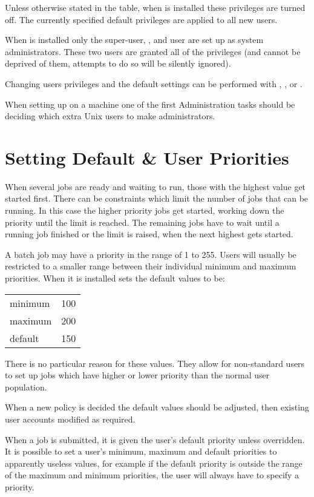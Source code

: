Unless otherwise stated in the table, when \ProductName{} is installed these
privileges are turned off. The currently specified default privileges
are applied to all new users.

When \ProductName{} is installed only the super-user, , and user \batchuser{} are set up
as system administrators. These two users are granted all of the privileges (and cannot be deprived of them, attempts to do
so will be silently ignored).

Changing users privileges and the default settings can be performed with \PrBtuser, \PrBtuchange, \PrXbtuser{} or
\PrXmbtuser.

When setting up \ProductName{} on a machine one of the first Administration tasks should be deciding which extra Unix users to make administrators.

\section{Setting Default \& User Priorities}
When several jobs are ready and waiting to run, those with the highest value get started first. There can be constraints which limit the
number of jobs that can be running. In this case the higher priority jobs get started, working down the priority until the limit is reached. The remaining jobs have to wait until a running job finished or the limit is raised, when the next highest gets started.

A batch job may have a priority in the range of 1 to 255. Users will usually be restricted to a smaller range between their individual
minimum and maximum priorities. When it is installed \ProductName{} sets the
default values to be:

\begin{center}
\begin{tabular}{l l}
minimum & 100\\
maximum & 200\\
default & 150\\
\end{tabular}
\end{center}

There is no particular reason for these values. They allow for non-standard users to set up jobs which have higher or lower priority
than the normal user population.

When a new policy is decided the default values should be adjusted, then existing user accounts modified as required.

When a job is submitted, it is given the user's default priority unless overridden. It is possible to set a user's minimum,
maximum and default priorities to apparently useless values, for example if the default priority is outside the range of the maximum and
minimum priorities, the user will always have to specify a priority.

